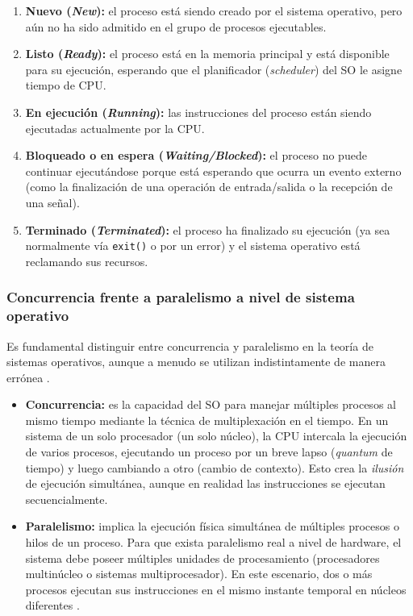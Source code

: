 \begin{enumerate}[leftmargin=*]
    \item \textbf{Nuevo (\textit{New}):} el proceso está siendo creado por el sistema operativo, pero aún no ha sido admitido en el grupo de procesos ejecutables.
    \item \textbf{Listo (\textit{Ready}):} el proceso está en la memoria principal y está disponible para su ejecución, esperando que el planificador (\textit{scheduler}) del SO le asigne tiempo de CPU.
    \item \textbf{En ejecución (\textit{Running}):} las instrucciones del proceso están siendo ejecutadas actualmente por la CPU.
    \item \textbf{Bloqueado o en espera (\textit{Waiting/Blocked}):} el proceso no puede continuar ejecutándose porque está esperando que ocurra un evento externo (como la finalización de una operación de entrada/salida o la recepción de una señal).
    \item \textbf{Terminado (\textit{Terminated}):} el proceso ha finalizado su ejecución (ya sea normalmente vía \texttt{exit()} o por un error) y el sistema operativo está reclamando sus recursos.
\end{enumerate}

\subsubsection{Concurrencia frente a paralelismo a nivel de sistema operativo}

Es fundamental distinguir entre concurrencia y paralelismo en la teoría de sistemas operativos, aunque a menudo se utilizan indistintamente de manera errónea \cite{tanenbaum:modern-os:2014}.

\begin{itemize}[leftmargin=*]
    \item \textbf{Concurrencia:} es la capacidad del SO para manejar múltiples procesos al mismo tiempo mediante la técnica de multiplexación en el tiempo. En un sistema de un solo procesador (un solo núcleo), la CPU intercala la ejecución de varios procesos, ejecutando un proceso por un breve lapso (\textit{quantum} de tiempo) y luego cambiando a otro (cambio de contexto). Esto crea la \textit{ilusión} de ejecución simultánea, aunque en realidad las instrucciones se ejecutan secuencialmente.
    \item \textbf{Paralelismo:} implica la ejecución física simultánea de múltiples procesos o hilos de un proceso. Para que exista paralelismo real a nivel de hardware, el sistema debe poseer múltiples unidades de procesamiento (procesadores multinúcleo o sistemas multiprocesador). En este escenario, dos o más procesos ejecutan sus instrucciones en el mismo instante temporal en núcleos diferentes \cite{stallings:os-internals:2017}.
\end{itemize}


